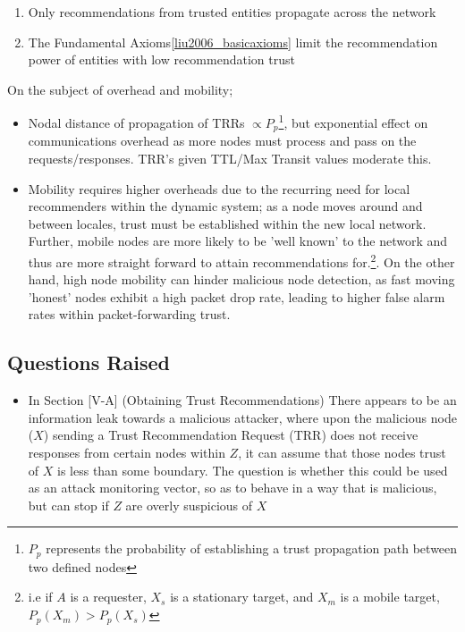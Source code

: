 \begin{itemize}
\begin{enumerate}
\begin{enumerate}
        \item Only recommendations from trusted entities propagate across the network
        \item The Fundamental Axioms\ref{liu2006_basicaxioms} limit the recommendation power of entities with low recommendation trust
      \end{enumerate}
      On the subject of overhead and mobility;
      \begin{itemize}
        \item Nodal distance of propagation of TRRs $\varpropto P_p$\footnote{$P_p$ represents the probability of establishing a trust propagation path between two defined nodes}, but exponential effect on communications overhead as more nodes must process and pass on the requests/responses. TRR's given TTL/Max Transit values moderate this.
        \item Mobility requires higher overheads due to the recurring need for local recommenders within the dynamic system; as a node moves around and between locales, trust must be established within the new local network. Further, mobile nodes are more likely to be 'well known' to the network and thus are more straight forward to attain recommendations for.\footnote{i.e if $A$ is a requester, $X_s$ is a stationary target, and $X_m$ is a mobile target, $P_p(X_m)>P_p(X_s)$}. On the other hand, high node mobility can hinder malicious node detection, as fast moving 'honest' nodes exhibit a high packet drop rate, leading to higher false alarm rates within packet-forwarding trust.
      \end{itemize}
      

    \end{enumerate}
\end{itemize}

\subsection{Questions Raised}
\begin{itemize}
  \item In Section [V-A] (Obtaining Trust Recommendations) There appears to be an information leak towards a malicious attacker, where upon the malicious node ($X$) sending a Trust Recommendation Request (TRR) does not receive responses from certain nodes within $Z$, it can assume that those nodes trust of $X$ is less than some boundary. The question is whether this could be used as an attack monitoring vector, so as to behave in a way that is malicious, but can stop if $Z$ are overly suspicious of $X$
\end{itemize}
